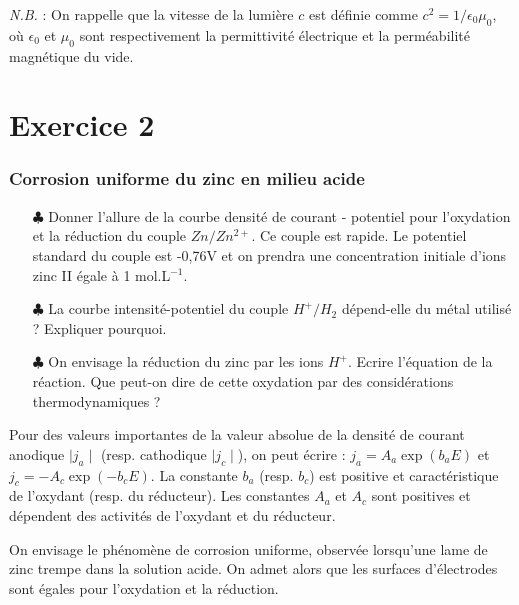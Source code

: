 \documentclass{report}
\begin{document}
\textit{N.B.} : On rappelle que la vitesse de la lumière $c$ est définie comme $c^{2}=1/\epsilon_{0}\mu_{0}$, où $\epsilon_{0}$ et $\mu_{0}$ sont respectivement la permittivité électrique et la perméabilité magnétique du vide.

\newpage

\section*{Exercice 2}

\subsubsection*{Corrosion uniforme du zinc en milieu acide}

\begin{itemize}

	\item[$\clubsuit$] Donner l'allure de la courbe densité de courant - potentiel pour l'oxydation et la réduction du couple $Zn/Zn^{2+}$. Ce couple est rapide. Le potentiel standard du couple est -0,76V et on prendra une concentration initiale d'ions zinc II égale à 1 mol.L$^{-1}$.
	
	\item[$\clubsuit$] La courbe intensité-potentiel du couple $H^+/H_2$ dépend-elle du métal utilisé ? Expliquer pourquoi.
	
	\item[$\clubsuit$] On envisage la réduction du zinc par les ions $H^+$. Ecrire l'équation de la réaction. Que peut-on dire de cette oxydation par des considérations thermodynamiques ?

\end{itemize}

Pour des valeurs importantes de la valeur absolue de la densité de courant anodique $\mid j_a\mid$ (resp. cathodique $\mid j_c\mid$), on peut écrire : $j_a=A_a\exp(b_aE)$ et $j_c=-A_c\exp(-b_cE)$. La constante $b_a$ (resp. $b_c$) est positive et caractéristique de l'oxydant (resp. du réducteur). Les constantes $A_a$ et $A_c$ sont positives et dépendent des activités de l'oxydant et du réducteur.

On envisage le phénomène de corrosion uniforme, observée lorsqu'une lame de zinc trempe dans la solution acide. On admet alors que les surfaces d'électrodes sont égales pour l'oxydation et la réduction. 
\end{document}
